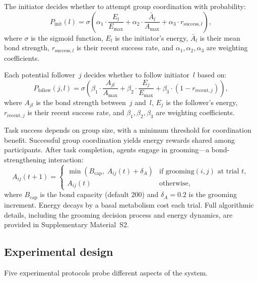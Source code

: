 \documentclass[12pt]{article}
\begin{document}
The initiator decides whether to attempt group coordination with probability:
\begin{equation}
P_\mathrm{init}(l) = \sigma\!\left(\alpha_1 \cdot \frac{E_l}{E_\mathrm{max}} + \alpha_2 \cdot \frac{\bar{A}_l}{A_\mathrm{max}} + \alpha_3 \cdot r_{\mathrm{success},l}\right),
\label{eq:pinit}
\end{equation}
where $\sigma$ is the sigmoid function, $E_l$ is the initiator's energy, $\bar{A}_l$ is their mean bond strength, $r_{\mathrm{success},l}$ is their recent success rate, and $\alpha_1, \alpha_2, \alpha_3$ are weighting coefficients.

Each potential follower~$j$ decides whether to follow initiator~$l$ based on:
\begin{equation}
P_\mathrm{follow}(j, l) = \sigma\!\left(\beta_1 \cdot \frac{A_{jl}}{A_\mathrm{max}} + \beta_2 \cdot \frac{E_j}{E_\mathrm{max}} + \beta_3 \cdot (1 - r_{\mathrm{recent},j})\right),
\label{eq:pfollow}
\end{equation}
where $A_{jl}$ is the bond strength between~$j$ and~$l$, $E_j$ is the follower's energy, $r_{\mathrm{recent},j}$ is their recent success rate, and $\beta_1, \beta_2, \beta_3$ are weighting coefficients.

Task success depends on group size, with a minimum threshold for coordination benefit. Successful group coordination yields energy rewards shared among participants. After task completion, agents engage in grooming---a bond-strengthening interaction:
\begin{equation}
A_{ij}(t+1) = \begin{cases} \min(B_\mathrm{cap},\; A_{ij}(t) + \delta_A) & \text{if grooming}(i,j) \text{ at trial } t, \\ A_{ij}(t) & \text{otherwise,} \end{cases}
\label{eq:bondupdate}
\end{equation}
where $B_\mathrm{cap}$ is the bond capacity (default 200) and $\delta_A = 0.2$ is the grooming increment. Energy decays by a basal metabolism cost each trial. Full algorithmic details, including the grooming decision process and energy dynamics, are provided in Supplementary Material~S2.


\subsection{Experimental design}
\label{sec:expdesign}

Five experimental protocols probe different aspects of the system.
\end{document}
